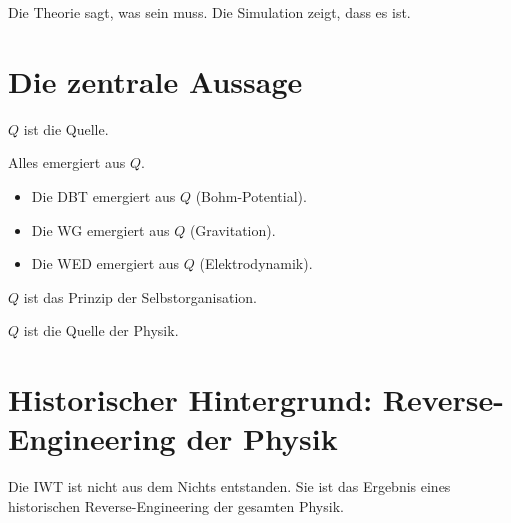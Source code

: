 Die Theorie sagt, was sein muss. Die Simulation zeigt, dass es ist.

\section{Die zentrale Aussage}

\( Q \) ist die Quelle.

Alles emergiert aus \( Q \).

\begin{itemize}
\item Die DBT emergiert aus \( Q \) (Bohm-Potential).
\item Die WG emergiert aus \( Q \) (Gravitation).
\item Die WED emergiert aus \( Q \) (Elektrodynamik).
\end{itemize}

\( Q \) ist das Prinzip der Selbstorganisation.

\( Q \) ist die Quelle der Physik.

\section{Historischer Hintergrund: Reverse-Engineering der Physik}

Die IWT ist nicht aus dem Nichts entstanden. Sie ist das Ergebnis eines historischen Reverse-Engineering der gesamten Physik.

